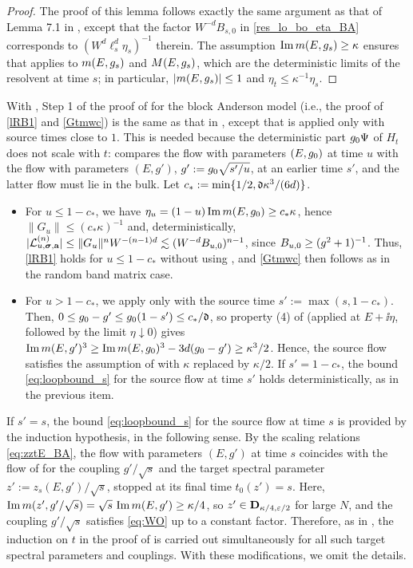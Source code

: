 \begin{proof}
The proof of this lemma follows exactly the same argument as that of Lemma 7.1 in \cite{RBSO1D}, except that the factor $W^{-d}B_{s,0}$ in \eqref{res_lo_bo_eta_BA} corresponds to $(W^d\ell_s^d\eta_s)^{-1}$ therein. The assumption $\operatorname{{\mathrm{Im}}} m(E,g_s)\ge\kappa$ ensures that  applies to $m(E,g_s)$ and $M(E,g_s)$, which are the deterministic limits of the resolvent at time $s$; in particular, $|m(E,g_s)|\le 1$ and $\eta_t\le \kappa^{-1}\eta_s$.
\end{proof}

With , Step 1 of the proof of  for the block Anderson model (i.e., the proof of \eqref{lRB1} and \eqref{Gtmwc}) is the same as that in \cite[Section 7.1]{RBSO1D}, except that  is applied only with source times close to $1$. This is needed because the deterministic part $g_0\Psi$ of $H_t$ does not scale with $t$:  compares the flow with parameters $(E,g_0)$ at time $u$ with the flow with parameters $(E,g')$, $g':=g_0\sqrt{s'/u}$, at an earlier time $s'$, and the latter flow must lie in the bulk. Let $c_*:=\min\{1/2,{\mathfrak d}\kappa^3/(6d)\}$.
\begin{itemize}
\item For $u\le 1-c_*$, we have $\eta_u=(1-u)\operatorname{{\mathrm{Im}}} m(E,g_0)\ge c_*\kappa$, hence $\|G_u\|\le (c_*\kappa)^{-1}$ and, deterministically, $|{\mathcal L}^{(n)}_{u,{\boldsymbol{\sigma}},{\mathbf{a}}}|\le \|G_u\|^nW^{-(n-1)d}\lesssim (W^{-d}B_{u,0})^{n-1}$, since $B_{u,0}\ge(g^2+1)^{-1}$. Thus, \eqref{lRB1} holds for $u\le 1-c_*$ without using , and \eqref{Gtmwc} then follows as in the random band matrix case.

\item For $u>1-c_*$, we apply  only with the source time $s':=\max(s,1-c_*)$. Then, $0\le g_0-g'\le g_0(1-s')\le c_*/{\mathfrak d}$, so property (4) of  (applied at $E+\ii\eta$, followed by the limit $\eta\downarrow 0$) gives $\operatorname{{\mathrm{Im}}} m(E,g')^3\ge \operatorname{{\mathrm{Im}}} m(E,g_0)^3-3d(g_0-g')\ge \kappa^3/2$. Hence, the source flow satisfies the assumption of  with $\kappa$ replaced by $\kappa/2$. If $s'=1-c_*$, the bound \eqref{eq:loopbound_s} for the source flow at time $s'$ holds deterministically, as in the previous item.
\end{itemize}
If $s'=s$, the bound \eqref{eq:loopbound_s} for the source flow at time $s$ is provided by the induction hypothesis, in the following sense. By the scaling relations \eqref{eq:zztE_BA}, the flow with parameters $(E,g')$ at time $s$ coincides with the flow of  for the coupling $g'/\sqrt{s}$ and the target spectral parameter $z':=z_{s}(E,g')/\sqrt{s}$, stopped at its final time $t_0(z')=s$. Here, $\operatorname{{\mathrm{Im}}} m(z',g'/\sqrt{s})=\sqrt{s}\,\operatorname{{\mathrm{Im}}} m(E,g')\ge\kappa/4$, so $z'\in\mathbf D_{\kappa/4,{\varepsilon}/2}$ for large $N$, and the coupling $g'/\sqrt{s}$ satisfies \eqref{eq:WO} up to a constant factor. Therefore, as in \cite[Section 7.1]{RBSO1D}, the induction on $t$ in the proof of  is carried out simultaneously for all such target spectral parameters and couplings. With these modifications, we omit the details.

